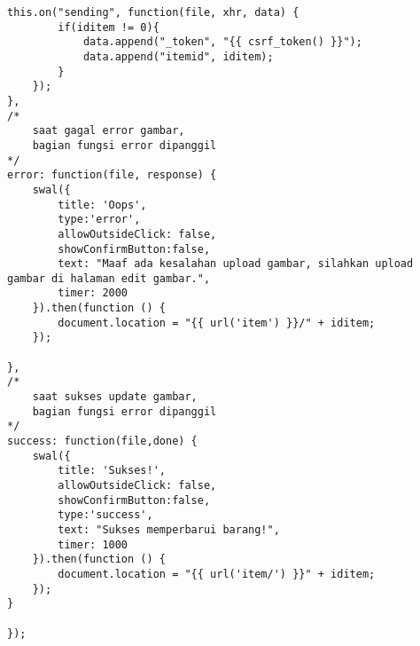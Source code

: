 \begin{lstlisting}[label=cdjq.03-02,style=htmlcssjs,caption=Kode Sumber \textit{View} Memperbarui Barang]
	this.on("sending", function(file, xhr, data) {
	    if(iditem != 0){
	        data.append("_token", "{{ csrf_token() }}");
	        data.append("itemid", iditem);
	    }
	});
},
/*	
	saat gagal error gambar,
	bagian fungsi error dipanggil
*/
error: function(file, response) {
    swal({
        title: 'Oops',
        type:'error',
        allowOutsideClick: false,
        showConfirmButton:false,
        text: "Maaf ada kesalahan upload gambar, silahkan upload gambar di halaman edit gambar.",
        timer: 2000
    }).then(function () {
        document.location = "{{ url('item') }}/" + iditem;
    });

},
/*	
	saat sukses update gambar,
	bagian fungsi error dipanggil
*/
success: function(file,done) {
    swal({
        title: 'Sukses!',
        allowOutsideClick: false,
        showConfirmButton:false,
        type:'success',
        text: "Sukses memperbarui barang!",
        timer: 1000
    }).then(function () {
        document.location = "{{ url('item/') }}" + iditem;
    });
}

});

\end{lstlisting}


